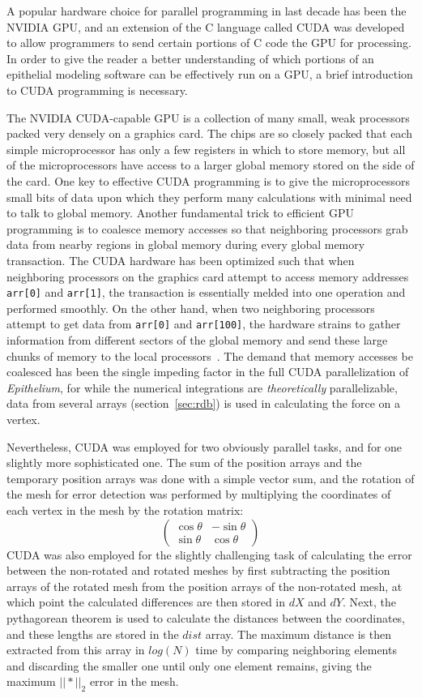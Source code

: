 A popular hardware choice for parallel programming in last decade has been the NVIDIA GPU, and an extension of the C language called CUDA was developed to allow programmers to send certain portions of C code the GPU for processing. In order to give the reader a better understanding of which portions of an epithelial modeling software can be effectively run on a GPU, a brief introduction to CUDA programming is necessary.

The NVIDIA CUDA-capable GPU is a collection of many small, weak processors packed very densely on a graphics card. The chips are so closely packed that each simple microprocessor has only a few registers in which to store memory, but all of the microprocessors have access to a larger global memory stored on the side of the card. One key to effective CUDA programming is to give the microprocessors small bits of data upon which they perform many calculations with minimal need to talk to global memory. Another fundamental trick to efficient GPU programming is to coalesce memory accesses so that neighboring processors grab data from nearby regions in global memory during every global memory transaction. The CUDA hardware has been optimized such that when neighboring processors on the graphics card attempt to access memory addresses \texttt{arr[0]} and \texttt{arr[1]}, the transaction is essentially melded into one operation and performed smoothly. On the other hand, when two neighboring processors attempt to get data from \texttt{arr[0]} and \texttt{arr[100]}, the hardware strains to gather information from different sectors of the global memory and send these large chunks of memory to the local processors~\cite{Udacity}. The demand that memory accesses be coalesced has been the single impeding factor in the full CUDA parallelization of \emph{Epithelium}, for while the numerical integrations are \emph{theoretically} parallelizable, data from several arrays (section~\ref{sec:rdb}) is used in calculating the force on a vertex.

Nevertheless, CUDA was employed for two obviously parallel tasks, and for one slightly more sophisticated one. The sum of the position arrays and the temporary position arrays was done with a simple vector sum, and the rotation of the mesh for error detection was performed by multiplying the coordinates of each vertex in the mesh by the rotation matrix:
\[ \left( \begin{array}{cc}
\cos\theta & -\sin\theta \\
\sin\theta & \cos\theta 
\end{array} \right)\] 
CUDA was also employed for the slightly challenging task of calculating the error between the non-rotated and rotated meshes by first subtracting the position arrays of the rotated mesh from the position arrays of the non-rotated mesh, at which point the calculated differences are then stored in $dX$ and $dY$. Next, the pythagorean theorem is used to calculate the distances between the coordinates, and these lengths are stored in the $dist$ array. The maximum distance is then extracted from this array in $log(N)$ time by comparing neighboring elements and discarding the smaller one until only one element remains, giving the maximum $||*||_2$ error in the mesh.

